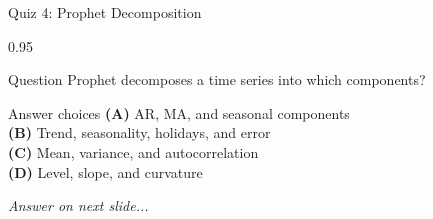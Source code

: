 \documentclass[9pt, aspectratio=169, t]{beamer}
\begin{document}
\begin{frame}{Quiz 4: Prophet Decomposition}
    \begin{cminipage}{0.95\textwidth}
    \begin{alertblock}{Question}
        Prophet decomposes a time series into which components?
    \end{alertblock}

    \vspace{0.4cm}

    \begin{block}{Answer choices}
        \textcolor{MainBlue}{\textbf{(A)}} AR, MA, and seasonal components\\[3pt]
        \textcolor{MainBlue}{\textbf{(B)}} Trend, seasonality, holidays, and error\\[3pt]
        \textcolor{MainBlue}{\textbf{(C)}} Mean, variance, and autocorrelation\\[3pt]
        \textcolor{MainBlue}{\textbf{(D)}} Level, slope, and curvature
    \end{block}

    \vspace{0.5cm}

    \begin{center}
        \textit{Answer on next slide...}
    \end{center}
    \end{cminipage}
\end{frame}
\end{document}
